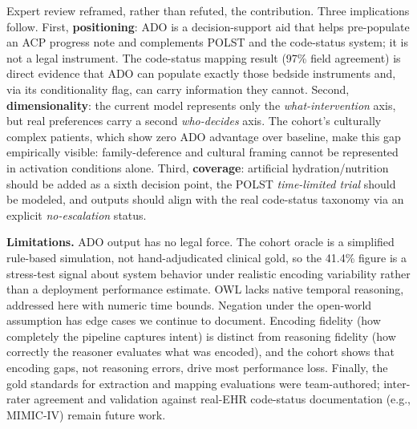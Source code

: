 \documentclass[10pt]{article}
\begin{document}
Expert review reframed, rather than refuted, the contribution. Three implications follow. First, \textbf{positioning}: ADO is a decision-support aid that helps pre-populate an ACP progress note and complements POLST and the code-status system; it is not a legal instrument. The code-status mapping result (97\% field agreement) is direct evidence that ADO can populate exactly those bedside instruments and, via its conditionality flag, can carry information they cannot. Second, \textbf{dimensionality}: the current model represents only the \emph{what-intervention} axis, but real preferences carry a second \emph{who-decides} axis. The cohort's culturally complex patients, which show zero ADO advantage over baseline, make this gap empirically visible: family-deference and cultural framing cannot be represented in activation conditions alone. Third, \textbf{coverage}: artificial hydration/nutrition should be added as a sixth decision point, the POLST \emph{time-limited trial} should be modeled, and outputs should align with the real code-status taxonomy via an explicit \emph{no-escalation} status.

\textbf{Limitations.} ADO output has no legal force. The cohort oracle is a simplified rule-based simulation, not hand-adjudicated clinical gold, so the 41.4\% figure is a stress-test signal about system behavior under realistic encoding variability rather than a deployment performance estimate. OWL lacks native temporal reasoning, addressed here with numeric time bounds. Negation under the open-world assumption has edge cases we continue to document. Encoding fidelity (how completely the pipeline captures intent) is distinct from reasoning fidelity (how correctly the reasoner evaluates what was encoded), and the cohort shows that encoding gaps, not reasoning errors, drive most performance loss. Finally, the gold standards for extraction and mapping evaluations were team-authored; inter-rater agreement and validation against real-EHR code-status documentation (e.g., MIMIC-IV) remain future work.

\end{document}
